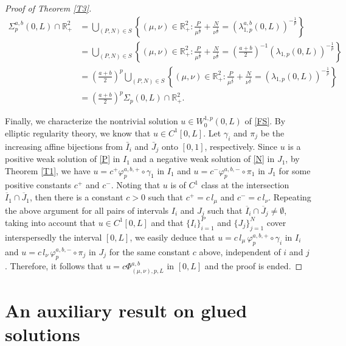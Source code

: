 \documentclass[a4paper,11pt]{article}
\newcommand{\R}{\mathbb{R}}
\begin{document}
{\begin{proof}[Proof of Theorem \ref{T3}]
\begin{align*}
\Sigma_{p}^{a,b}(0,L) \cap \R_+^2 &= \bigcup_{(P,N) \in S}\left\{(\mu,\nu) \in \R_+^2 \colon \frac{P}{\mu^{\frac{1}{p}}} + \frac{N}{\nu^{\frac{1}{p}}} = \left(\lambda_{1,p}^{a,b}(0,L)\right)^{-\frac{1}{p}} \right\} \\
&= \bigcup_{(P,N) \in S}\left\{(\mu,\nu) \in \R_+^2 \colon \frac{P}{\mu^{\frac{1}{p}}} + \frac{N}{\nu^{\frac{1}{p}}} =  \left(\frac{a+b}{2}\right)^{-1} \left(\lambda_{1,p}(0,L)\right)^{-\frac{1}{p}} \right\} \\
&= \left(\frac{a+b}{2}\right)^{p}\bigcup_{(P,N) \in S}\left\{(\mu,\nu) \in \R_+^2 \colon \frac{P}{\mu^{\frac{1}{p}}} + \frac{N}{\nu^{\frac{1}{p}}} =  \left(\lambda_{1,p}(0,L)\right)^{-\frac{1}{p}}\right\} \\
&= \left(\frac{a+b}{2}\right)^{p}\Sigma_{p}(0,L) \cap \R_+^2.
\end{align*}

Finally, we characterize the nontrivial solution $u \in W_0^{1,p}(0,L)$ of \eqref{FS}. By elliptic regularity theory, we know that $u \in C^1[0,L]$. Let $\gamma_i$ and $\pi_j$ be the increasing affine bijections from $\bar{I}_i$ and $\bar{J}_j$ onto $[0,1]$, respectively. Since $u$ is a positive weak solution of \eqref{P} in $I_1$ and a negative weak solution of \eqref{N} in $J_1$, by Theorem \ref{T1}, we have $u = c^+ \varphi_{p}^{a,b,+} \circ \gamma_1$ in $I_1$ and $u = c^- \varphi_{p}^{a,b,-} \circ \pi_1$ in $J_1$ for some positive constants $c^+$ and $c^-$. Noting that $u$ is of $C^1$ class at the intersection $\overline{I}_1 \cap \overline{J}_1$, then there is a constant $c > 0$ such that $c^+ = c\, l_\mu$ and $c^- = c\, l_\nu$. Repeating the above argument for all pairs of intervals $I_i$ and $J_j$ such that $\overline{I}_i \cap \overline{J}_j \neq \emptyset$, taking into account that $u \in C^1[0,L]$ and that $\{I_i\}^P_{i=1}$ and $\{J_j\}^N_{j=1}$ cover interspersedly the interval $[0,L]$, we easily deduce that $u = c\, l_\mu\, \varphi_{p}^{a,b,+} \circ \gamma_i$ in $I_i$ and $u =  c\, l_\nu\,  \varphi_{p}^{a,b,-} \circ \pi_j$ in $J_j$ for the same constant $c$ above, independent of $i$ and $j$. Therefore, it follows that $u = c \Phi_{(\mu, \nu), p, L}^{a,b}$ in $[0, L]$ and the proof is ended.
\end{proof}

\appendix
\section{An auxiliary result on glued solutions}

}
\end{document}
